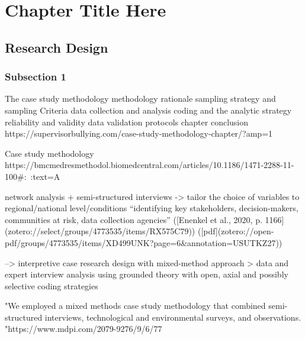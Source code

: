 
\chapter{Chapter Title Here} %

\label{ChapterX} %


\section{Research Design}

\subsection{Subsection 1}
The case study methodology
methodology rationale 
sampling strategy and sampling Criteria
data collection and analysis
coding and the analytic strategy
reliability and validity
data validation protocols
chapter conclusion
https://supervisorbullying.com/case-study-methodology-chapter/?amp=1

Case study methodology
https://bmcmedresmethodol.biomedcentral.com/articles/10.1186/1471-2288-11-100#:~:text=A%

network analysis + semi-structured interviews -> tailor the choice of variables to regional/national level/conditions “identifying key stakeholders, decision-makers, communities at risk, data collection agencies” ([Enenkel et al., 2020, p. 1166](zotero://select/groups/4773535/items/RX575C79)) ([pdf](zotero://open-pdf/groups/4773535/items/XD499UNK?page=6&annotation=USUTKZ27))



--> interpretive case research design with mixed-method approach > data and expert interview analysis using grounded theory with open, axial and possibly selective coding strategies

"We employed a mixed methods case study methodology that combined semi-structured interviews, technological and environmental surveys, and observations. "https://www.mdpi.com/2079-9276/9/6/77


